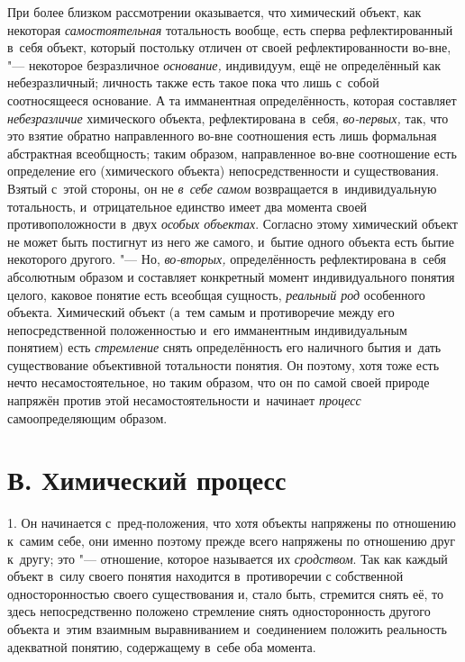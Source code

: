 При более близком рассмотрении оказывается, что химический
объект, как некоторая
{\em самостоятельная}
тотальность вообще, есть сперва рефлектированный в~себя
объект, который постольку отличен от своей рефлектированности во-вне, "---
некоторое безразличное
{\em основание,}
индивидуум, ещё не определённый как небезразличный; личность
также есть такое пока что лишь с~собой соотносящееся
основание.
А та имманентная определённость, которая составляет
{\em небезразличие}
химического объекта, рефлектирована в~себя,
{\em во-первых,} так, что
это взятие обратно направленного во-вне соотношения есть лишь формальная
абстрактная всеобщность; таким образом, направленное во-вне соотношение
есть определение его (химического объекта) непосредственности и
существования. Взятый с~этой стороны, он не
{\em в~себе самом}
возвращается в~индивидуальную тотальность, и~отрицательное
единство имеет два момента своей противоположности в~двух
{\em особых объектах}.
Согласно этому химический объект не может быть постигнут из
него же самого, и~бытие одного объекта есть бытие некоторого другого. "---
Но, {\em во-вторых,}
определённость рефлектирована в~себя абсолютным образом и
составляет конкретный момент индивидуального понятия целого, каковое
понятие есть всеобщая сущность,
{\em реальный род}
особенного объекта. Химический объект (а~тем самым и
противоречие между его непосредственной положенностью и~его имманентным
индивидуальным понятием) есть
{\em стремление} снять
определённость его наличного бытия и~дать существование объективной
тотальности понятия. Он поэтому, хотя тоже есть нечто несамостоятельное, но
таким образом, что он по самой своей природе напряжён против этой
несамостоятельности и~начинает
{\em процесс}
самоопределяющим образом.

\section[В. Химический процесс]{В. Химический процесс}

1. Он начинается с~пред-положения, что хотя объекты напряжены
по отношению к~самим себе, они именно поэтому прежде всего напряжены по
отношению друг к~другу; это "--- отношение, которое называется
их {\em сродством}. Так
как каждый объект в~силу своего понятия находится в~противоречии с
собственной односторонностью своего существования и, стало быть, стремится
снять её, то здесь непосредственно положено стремление снять
односторонность другого объекта и~этим взаимным выравниванием и~соединением
положить реальность адекватной понятию, содержащему в~себе оба момента.

